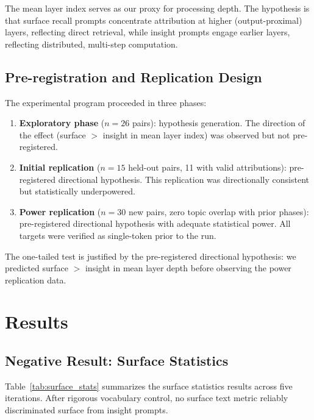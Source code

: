 \documentclass[10pt]{article}
\begin{document}
The mean layer index serves as our proxy for processing depth. The hypothesis is that surface recall prompts concentrate attribution at higher (output-proximal) layers, reflecting direct retrieval, while insight prompts engage earlier layers, reflecting distributed, multi-step computation.

\subsection{Pre-registration and Replication Design}

The experimental program proceeded in three phases:

\begin{enumerate}
    \item \textbf{Exploratory phase} ($n{=}26$ pairs): hypothesis generation. The direction of the effect (surface $>$ insight in mean layer index) was observed but not pre-registered.
    \item \textbf{Initial replication} ($n{=}15$ held-out pairs, 11 with valid attributions): pre-registered directional hypothesis. This replication was directionally consistent but statistically underpowered.
    \item \textbf{Power replication} ($n{=}30$ new pairs, zero topic overlap with prior phases): pre-registered directional hypothesis with adequate statistical power. All targets were verified as single-token prior to the run.
\end{enumerate}

The one-tailed test is justified by the pre-registered directional hypothesis: we predicted surface $>$ insight in mean layer depth before observing the power replication data.

\section{Results}

\subsection{Negative Result: Surface Statistics}
\label{sec:negative}

Table~\ref{tab:surface_stats} summarizes the surface statistics results across five iterations. After rigorous vocabulary control, no surface text metric reliably discriminated surface from insight prompts.
\end{document}
